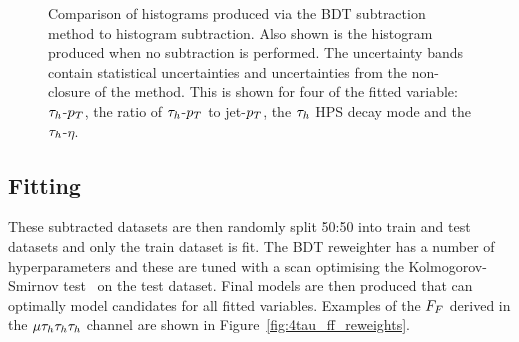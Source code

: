 \begin{figure}[p!]
\caption[Plots of the validation of the BDT subtraction method.]{Comparison of histograms produced via the BDT subtraction method to histogram subtraction. Also shown is the histogram produced when no subtraction is performed. The uncertainty bands contain statistical uncertainties and uncertainties from the non-closure of the method. This is shown for four of the fitted variable: $\tau_{h}$-$p_{T}$, the ratio of $\tau_{h}$-$p_{T}$ to jet-$p_{T}$, the $\tau_{h}$ HPS decay mode and the $\tau_{h}$-$\eta$.}
\label{fig:4tau_ff_subtraction}
\end{figure}

\subsection{Fitting}

These subtracted datasets are then randomly split 50:50 into train and test datasets and only the train dataset is fit. 
The \ac{BDT} reweighter has a number of hyperparameters and these are tuned with a scan optimising the Kolmogorov-Smirnov test~\cite{16e7f618-c06b-3d10-8705-1086b218d827} on the test dataset.
Final models are then produced that can optimally model \jtth candidates for all fitted variables. 
Examples of the $F_{F}$ derived in the $\mu\tau_{h}\tau_{h}\tau_{h}$ channel are shown in Figure~\ref{fig:4tau_ff_reweights}. \\

